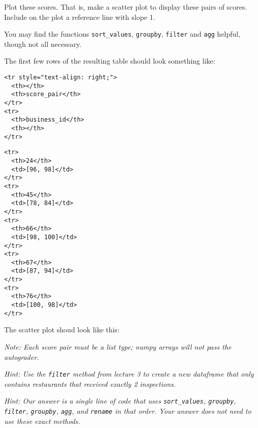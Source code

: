 \documentclass[11pt]{article}
\begin{document}
Plot these scores. That is, make a scatter plot to display these pairs
of scores. Include on the plot a reference line with slope 1.

You may find the functions \texttt{sort\_values}, \texttt{groupby},
\texttt{filter} and \texttt{agg} helpful, though not all necessary.

The first few rows of the resulting table should look something like:

\begin{verbatim}
<tr style="text-align: right;">
  <th></th>
  <th>score_pair</th>
</tr>
<tr>
  <th>business_id</th>
  <th></th>
</tr>
\end{verbatim}

\begin{verbatim}
<tr>
  <th>24</th>
  <td>[96, 98]</td>
</tr>
<tr>
  <th>45</th>
  <td>[78, 84]</td>
</tr>
<tr>
  <th>66</th>
  <td>[98, 100]</td>
</tr>
<tr>
  <th>67</th>
  <td>[87, 94]</td>
</tr>
<tr>
  <th>76</th>
  <td>[100, 98]</td>
</tr>
\end{verbatim}

The scatter plot shoud look like this:

 \emph{Note: Each score pair must be a list type; numpy arrays will not
pass the autograder.}

\emph{Hint: Use the \texttt{filter} method from lecture 3 to create a
new dataframe that only contains restaurants that received exactly 2
inspections.}

\emph{Hint: Our answer is a single line of code that uses
\texttt{sort\_values}, \texttt{groupby}, \texttt{filter},
\texttt{groupby}, \texttt{agg}, and \texttt{rename} in that order. Your
answer does not need to use these exact methods.}
\end{document}
